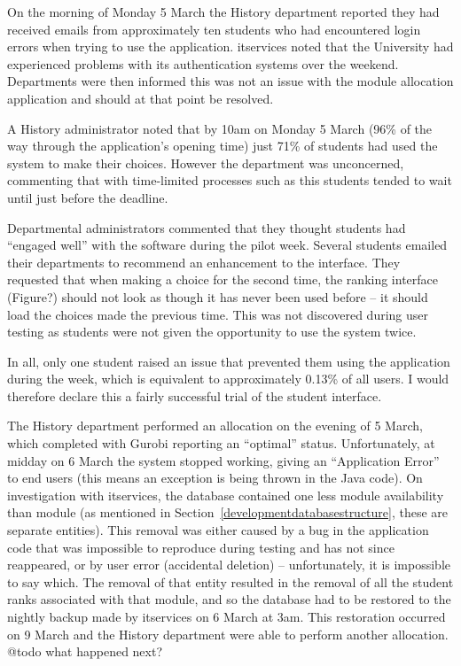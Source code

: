 On the morning of Monday 5 March the History department reported they had
received emails from approximately ten students who had encountered login
errors when trying to use the application. \gls{itservices} noted that the
University had experienced problems with its authentication systems over the
weekend. Departments were then informed this was not an issue with the module
allocation application and should at that point be resolved.

A History administrator noted that by 10am on Monday 5 March (96\% of the way
through the application's opening time) just 71\% of students had used the
system to make their choices. However the department was unconcerned,
commenting that with time-limited processes such as this students tended to
wait until just before the deadline.

Departmental administrators commented that they thought students had ``engaged
well'' with the software during the pilot week. Several students emailed their
departments to recommend an enhancement to the interface. They requested that
when making a choice for the second time, the ranking interface (Figure?)
should not look as though it has never been used before -- it should load the
choices made the previous time. This was not discovered during user testing as
students were not given the opportunity to use the system twice.

In all, only one student raised an issue that prevented them using the
application during the week, which is equivalent to approximately 0.13\% of
all users. I would therefore declare this a fairly successful trial of the
student interface.

The History department performed an allocation on the evening of 5 March,
which completed with Gurobi reporting an ``optimal'' status. Unfortunately, at
midday on 6 March the system stopped working, giving an ``Application Error''
to end users (this means an exception is being thrown in the Java code). On
investigation with \gls{itservices}, the database contained one less module
availability than module (as mentioned in
Section~\ref{developmentdatabasestructure}, these are separate entities). This
removal was either caused by a bug in the application code that was impossible
to reproduce during testing and has not since reappeared, or by user error
(accidental deletion) -- unfortunately, it is impossible to say which. The
removal of that entity resulted in the removal of all the student ranks
associated with that module, and so the database had to be restored to the
nightly backup made by \gls{itservices} on 6 March at 3am. This restoration
occurred on 9 March and the History department were able to perform another
allocation. @todo what happened next?

